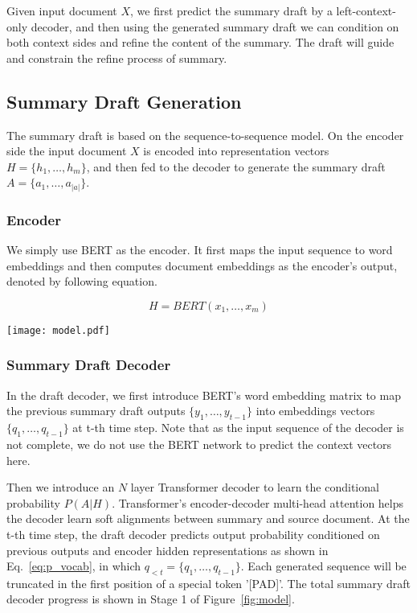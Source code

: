 \documentclass{article}
\begin{document}
 Given input document $X$, we first predict the summary draft by a left-context-only decoder, and then using the generated summary draft we can condition on both context sides and refine the content of the summary. The draft will guide and constrain the refine process of summary.
 
\subsection{Summary Draft Generation}

The summary draft is based on the sequence-to-sequence model. On the encoder side the input document $X$ is encoded into representation vectors $H = \{h_1, \ldots, h_m\}$, and then fed to the decoder to generate the summary draft $A = \{a_1, \ldots, a_{|a|}\}$.

\subsubsection{Encoder}

We simply use BERT as the encoder. It first maps the input sequence to word embeddings and then computes document embeddings as the encoder's output, denoted by following equation.

\begin{equation}
    H = BERT(x_1, \ldots, x_m)
\end{equation}

\begin{figure*}[htbp]
	\centering
	\small
	\texttt{[image: model.pdf]}
	\makeatletter\def\@captype{figure}\makeatother \caption{Model Overview, N represents decoder layer number and L represents summary length.\label{fig:model}}
\end{figure*}

\subsubsection{Summary Draft Decoder}

In the draft decoder, we first introduce BERT's word embedding matrix to map the previous summary draft outputs $\{y_1, \ldots, y_{t-1}\}$ into embeddings vectors $\{q_1, \ldots, q_{t-1}\}$ at t-th time step. Note that as the input sequence of the decoder is not complete, we do not use the BERT network to predict the context vectors here.

Then we introduce an $N$ layer Transformer decoder to learn the conditional probability $P(A|H)$. Transformer's encoder-decoder multi-head attention helps the decoder learn soft alignments between summary and source document. At the t-th time step, the draft decoder predicts output probability conditioned on previous outputs and encoder hidden representations as shown in Eq.~\eqref{eq:p_vocab}, in which $q_{<t} = \{q_1, \ldots, q_{t-1}\}$. Each generated sequence will be truncated in the first position of a special token '[PAD]'. The total summary draft decoder progress is shown in Stage 1 of Figure~\ref{fig:model}.
\end{document}
